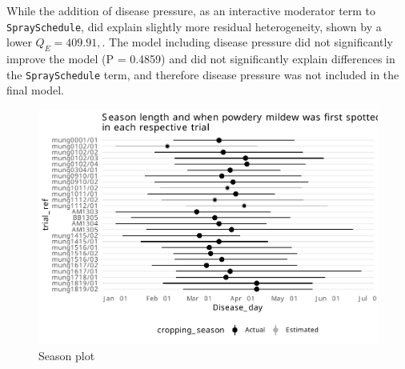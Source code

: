 \documentclass[agronomy,article,submit,moreauthors,pdftex]{mdpi}
\begin{document}
While the addition of disease pressure, as an interactive moderator term to \texttt{SpraySchedule}, did explain slightly more residual heterogeneity, shown by a lower \(Q_E = 409.91,\).
The model including disease pressure did not significantly improve the model (P = 0.4859) and did not significantly explain differences in the \texttt{SpraySchedule} term, and therefore disease pressure was not included in the final model.

\begin{figure}
\centering
\includegraphics{paper_files/figure-latex/Figure2-1.pdf}
\caption{\label{fig:Figure2}Season plot}
\end{figure}
\end{document}
